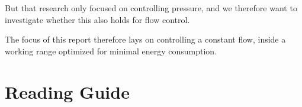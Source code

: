 But that research only focused on controlling pressure,
and we therefore want to investigate whether this also holds for flow control.

The focus of this report therefore lays on controlling a constant flow,
inside a working range optimized for minimal energy consumption.
%
%
%
%
%
%
%
%
%
%
%
%

\section*{Reading Guide}
